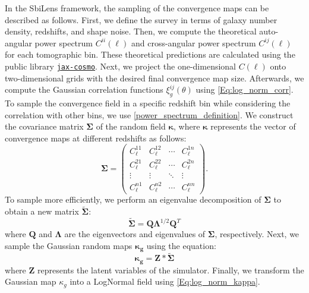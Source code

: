 \documentclass{aa}
\begin{document}
 In the SbiLens framework, the sampling of the convergence maps can be described as follows. 
First, we define the survey in terms of galaxy number density, redshifts, and shape noise.  Then, we compute the theoretical auto-angular power spectrum $C^{ii}(\ell)$ and cross-angular power spectrum $C^{ij}(\ell)$ for each tomographic bin. These theoretical predictions are calculated using the public library \href{https://github.com/DifferentiableUniverseInitiative/jax_cosmo}{\texttt{jax-cosmo}}. 
Next, we project the one-dimensional $C(\ell)$ onto two-dimensional grids with the desired final convergence map size. Afterwards, we compute the Gaussian correlation functions $\xi^{ij}_g(\theta)$ using \autoref{Eq:log_norm_corr}.
 To sample the convergence field in a specific redshift bin while considering the correlation with other bins, we use \autoref{power_spectrum_definition}. 
We construct the covariance matrix $\bm{\Sigma}$ of the random field $\bm{\kappa}$, where $\bm{\kappa}$ represents the vector of convergence maps at different redshifts as follows:
 \begin{equation}
    \bm{\Sigma}= 
    \begin{pmatrix}
    C_{\ell}^{11} & C_{\ell}^{12} & \cdots & C_{\ell}^{1n} \\
    C_{\ell}^{21} & C_{\ell}^{22} & \cdots & C_{\ell}^{2n} \\
    \vdots  & \vdots  & \ddots & \vdots  \\
    C_{\ell}^{n1} & C_{\ell}^{n2} & \cdots & C_{\ell}^{nn} 
    \end{pmatrix}.
\end{equation}
To sample more efficiently, we perform an eigenvalue decomposition of $\bm{\Sigma}$ to obtain a new matrix $\tilde{\bm{\Sigma}}$:
\begin{equation}
    \tilde{\bm{\Sigma} }=\bm{Q}\bm{\Lambda}^{1/2}\bm{Q}^{T}
\end{equation}
where $\bm{Q}$ and $\bm{\Lambda}$ are the eigenvectors and eigenvalues of $\bm{\Sigma}$, respectively.
Next, we sample the Gaussian random maps $\bm{\kappa_g}$ using the equation:
\begin{equation}
     \bm{\kappa_g}=\bm{Z}*\tilde{\bm{\Sigma} }
\end{equation}
where $\bm{Z}$ represents the latent variables of the simulator.
Finally, we transform the Gaussian map $\kappa_g$ into a LogNormal field using \autoref{Eq:log_norm_kappa}.
\end{document}
